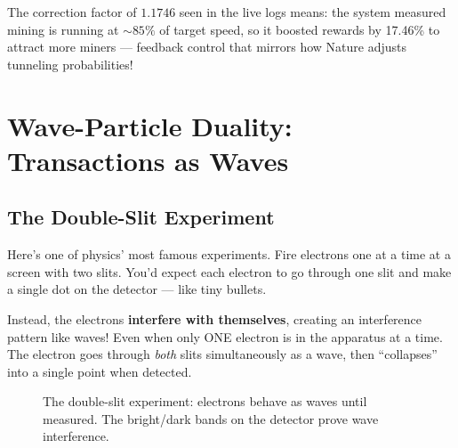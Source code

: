 \documentclass[11pt,a4paper]{article}
\begin{document}
The correction factor of $1.1746$ seen in the live logs means: the system measured mining is running at $\sim 85\%$ of target speed, so it boosted rewards by 17.46\% to attract more miners --- feedback control that mirrors how Nature adjusts tunneling probabilities!

\section{Wave-Particle Duality: Transactions as Waves}

\subsection{The Double-Slit Experiment}

Here's one of physics' most famous experiments. Fire electrons one at a time at a screen with two slits. You'd expect each electron to go through one slit and make a single dot on the detector --- like tiny bullets.

Instead, the electrons \textbf{interfere with themselves}, creating an interference pattern like waves! Even when only ONE electron is in the apparatus at a time. The electron goes through \textit{both} slits simultaneously as a wave, then ``collapses'' into a single point when detected.

\begin{figure}[H]
\centering
{}
\caption{The double-slit experiment: electrons behave as waves until measured. The bright/dark bands on the detector prove wave interference.}
\end{figure}
\end{document}
